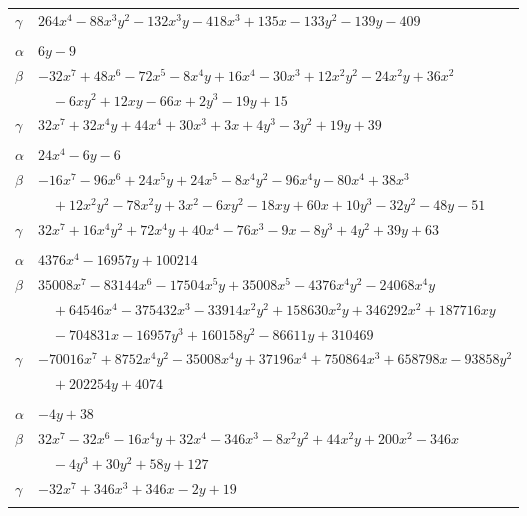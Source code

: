 \documentclass[11pt]{article}
\begin{document}
\begin{longtable}{@{}ll@{}}
$\gamma$ & $264x^{4}-88x^{3}y^{2}-132x^{3}y-418x^{3}+135x-133y^{2}-139y-409$\\
\addlinespace[3pt]
\multicolumn{2}{@{}l}{$\{i,j\}=\{39,77\}$, $k_{ij}=2\cdot 3^{3}$}\\
$\alpha$ & $6y-9$\\
$\beta$ & $-32x^{7}+48x^{6}-72x^{5}-8x^{4}y+16x^{4}-30x^{3}+12x^{2}y^{2}-24x^{2}y+36x^{2}$\\
 & $\quad -6xy^{2}+12xy-66x+2y^{3}-19y+15$\\
$\gamma$ & $32x^{7}+32x^{4}y+44x^{4}+30x^{3}+3x+4y^{3}-3y^{2}+19y+39$\\
\addlinespace[3pt]
\multicolumn{2}{@{}l}{$\{i,j\}=\{39,92\}$, $k_{ij}=2^{2}\cdot 3^{3}$}\\
$\alpha$ & $24x^{4}-6y-6$\\
$\beta$ & $-16x^{7}-96x^{6}+24x^{5}y+24x^{5}-8x^{4}y^{2}-96x^{4}y-80x^{4}+38x^{3}$\\
 & $\quad +12x^{2}y^{2}-78x^{2}y+3x^{2}-6xy^{2}-18xy+60x+10y^{3}-32y^{2}-48y-51$\\
$\gamma$ & $32x^{7}+16x^{4}y^{2}+72x^{4}y+40x^{4}-76x^{3}-9x-8y^{3}+4y^{2}+39y+63$\\
\addlinespace[3pt]
\multicolumn{2}{@{}l}{$\{i,j\}=\{40,65\}$, $k_{ij}=2^{2}\cdot 3\cdot 5^{2}\cdot 11\cdot 13\cdot 17$}\\
$\alpha$ & $4376x^{4}-16957y+100214$\\
$\beta$ & $35008x^{7}-83144x^{6}-17504x^{5}y+35008x^{5}-4376x^{4}y^{2}-24068x^{4}y$\\
 & $\quad +64546x^{4}-375432x^{3}-33914x^{2}y^{2}+158630x^{2}y+346292x^{2}+187716xy$\\
 & $\quad -704831x-16957y^{3}+160158y^{2}-86611y+310469$\\
$\gamma$ & $-70016x^{7}+8752x^{4}y^{2}-35008x^{4}y+37196x^{4}+750864x^{3}+658798x-93858y^{2}$\\
 & $\quad +202254y+4074$\\
\addlinespace[3pt]
\multicolumn{2}{@{}l}{$\{i,j\}=\{40,77\}$, $k_{ij}=2\cdot 3\cdot 5\cdot 11$}\\
$\alpha$ & $-4y+38$\\
$\beta$ & $32x^{7}-32x^{6}-16x^{4}y+32x^{4}-346x^{3}-8x^{2}y^{2}+44x^{2}y+200x^{2}-346x$\\
 & $\quad -4y^{3}+30y^{2}+58y+127$\\
$\gamma$ & $-32x^{7}+346x^{3}+346x-2y+19$\\
\addlinespace[3pt]
\multicolumn{2}{@{}l}{$\{i,j\}=\{40,78\}$, $k_{ij}=2\cdot 3\cdot 5^{2}\cdot 13\cdot 17$}\\

\end{longtable}
\end{document}
